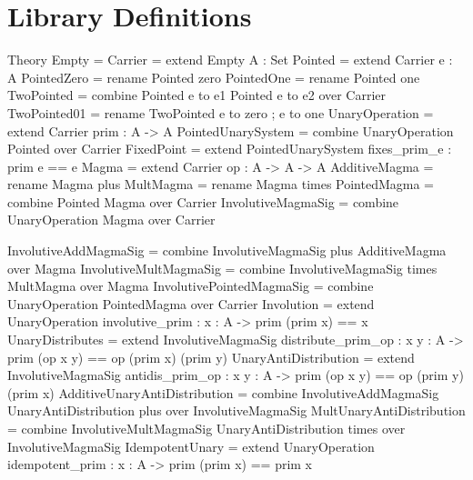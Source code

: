 \chapter{Library Definitions}
\label{appendix:input}

\begin{togcode}
Theory Empty = {} 
Carrier = extend Empty {A : Set}
Pointed = extend Carrier {e : A}
PointedZero = rename Pointed zero
PointedOne  = rename Pointed one 
TwoPointed = combine Pointed {e to e1} Pointed {e to e2} over Carrier 
TwoPointed01 = rename TwoPointed {e to zero ; e to one} 
UnaryOperation = extend Carrier {prim : A -> A}
PointedUnarySystem = combine UnaryOperation {} Pointed {} over Carrier
FixedPoint = extend PointedUnarySystem {fixes_prim_e : prim e == e} 
Magma = extend Carrier {op : A -> A -> A}
AdditiveMagma = rename Magma plus
MultMagma = rename Magma times 
PointedMagma = combine Pointed {} Magma {} over Carrier
InvolutiveMagmaSig = 
  combine UnaryOperation {} Magma {} over Carrier
\end{togcode}

\begin{togcode} 
InvolutiveAddMagmaSig = 
  combine InvolutiveMagmaSig plus AdditiveMagma {} over Magma
InvolutiveMultMagmaSig = 
  combine InvolutiveMagmaSig times MultMagma {} over Magma 
InvolutivePointedMagmaSig = 
  combine UnaryOperation {} PointedMagma {} over Carrier 
Involution = 
  extend UnaryOperation {involutive_prim : {x : A} -> prim (prim x) == x} 
UnaryDistributes =
  extend InvolutiveMagmaSig 
     {distribute_prim_op : {x y : A} -> 
         prim (op x y) == op (prim x) (prim y) }
UnaryAntiDistribution =
  extend InvolutiveMagmaSig 
     {antidis_prim_op : {x y : A} -> 
         prim (op x y) == op (prim y) (prim x) }
AdditiveUnaryAntiDistribution =
  combine InvolutiveAddMagmaSig {} UnaryAntiDistribution plus 
  over InvolutiveMagmaSig
MultUnaryAntiDistribution =
  combine InvolutiveMultMagmaSig {} UnaryAntiDistribution times 
  over InvolutiveMagmaSig   
IdempotentUnary =
  extend UnaryOperation 
     {idempotent_prim : {x : A} -> prim (prim x) == prim x}
\end{togcode} 


